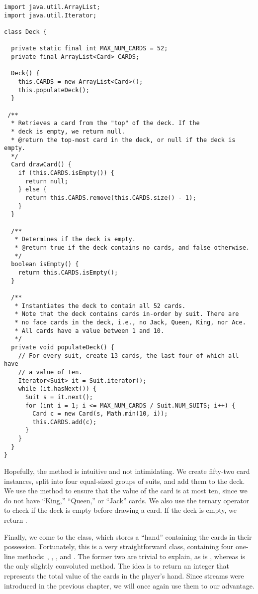 \enlargethispage{-5\baselineskip}
\begin{lstlisting}[language=MyJava]
import java.util.ArrayList;
import java.util.Iterator;

class Deck {

  private static final int MAX_NUM_CARDS = 52;
  private final ArrayList<Card> CARDS;

  Deck() {
    this.CARDS = new ArrayList<Card>();
    this.populateDeck();
  }

 /**
  * Retrieves a card from the "top" of the deck. If the
  * deck is empty, we return null.
  * @return the top-most card in the deck, or null if the deck is empty.
  */
  Card drawCard() {
    if (this.CARDS.isEmpty()) {
      return null;
    } else {
      return this.CARDS.remove(this.CARDS.size() - 1);
    }
  }

  /**
   * Determines if the deck is empty.
   * @return true if the deck contains no cards, and false otherwise.
   */
  boolean isEmpty() { 
    return this.CARDS.isEmpty(); 
  }

  /**
   * Instantiates the deck to contain all 52 cards.
   * Note that the deck contains cards in-order by suit. There are 
   * no face cards in the deck, i.e., no Jack, Queen, King, nor Ace.
   * All cards have a value between 1 and 10.
   */
  private void populateDeck() {
    // For every suit, create 13 cards, the last four of which all have
    // a value of ten.
    Iterator<Suit> it = Suit.iterator();
    while (it.hasNext()) {
      Suit s = it.next();
      for (int i = 1; i <= MAX_NUM_CARDS / Suit.NUM_SUITS; i++) {
        Card c = new Card(s, Math.min(10, i));
        this.CARDS.add(c);
      }
    }
  }
}
\end{lstlisting}

\newpage %
Hopefully, the  method is intuitive and not intimidating. 
We create fifty-two card instances, split into four equal-sized groups of suits, and add them to the deck.
We use the  method to ensure that the value of the card is at most ten, since we do not have ``King,'' ``Queen,'' or ``Jack'' cards. 
We also use the ternary operator to check if the deck is empty before drawing a card. 
If the deck is empty, we return .

Finally, we come to the  class, which stores a ``hand'' containing the cards in their possession. 
Fortunately, this is a very straightforward class, containing four one-line methods: , , , and . 
The former two are trivial to explain, as is , whereas  is the only slightly convoluted method. 
The idea is to return an integer that represents the total value of the cards in the player's hand. 
Since streams were introduced in the previous chapter, we will once again use them to our advantage.

